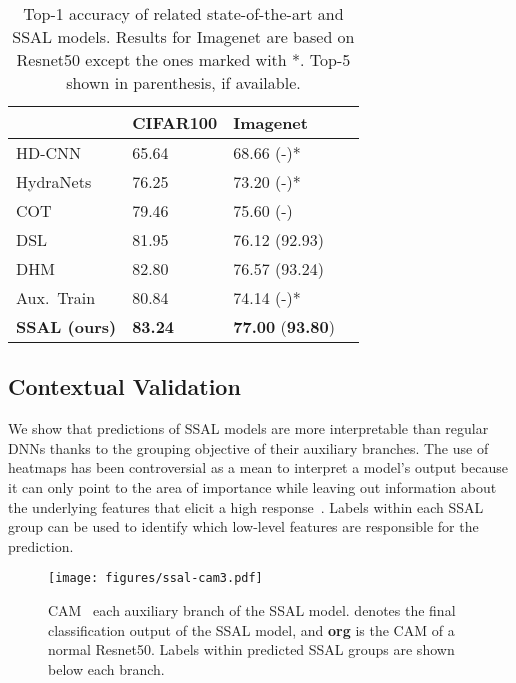 \documentclass[10pt,twocolumn,letterpaper]{article}
\begin{document}
\begin{table}[t]
\centering
\begin{tabulary}{\textwidth}{@{}p{85pt}p{55pt}p{55pt}p{55pt}@{}}
\toprule
                                        & CIFAR100        & Imagenet                                   \\
\midrule
HD-CNN~\cite{yan2015hd}                 & 65.64           & 68.66 (-)*                                 \\
HydraNets~\cite{mullapudi2018hydranets} & 76.25           & 73.20 (-)*                                 \\
COT~\cite{chen2018complement}           & 79.46           & 75.60 (-)                                  \\
DSL~\cite{lee2015deeply,li2020dynamic}  & 81.95           & 76.12 (92.93)                              \\
DHM~\cite{li2020dynamic}                & 82.80           & 76.57 (93.24)                              \\
Aux.~Train~\cite{zhang2020auxiliary}    & 80.84           & 74.14 (-)*                                 \\
\textbf{SSAL (ours)}                    & \textbf{83.24}  & \textbf{77.00}  (\textbf{93.80})   \\
\bottomrule
\end{tabulary}
\caption{Top-1 accuracy of related state-of-the-art and SSAL models. Results for Imagenet are based on Resnet50 except the ones marked with *. Top-5 shown in parenthesis, if available.}
\label{tab:sota}
\end{table}


\subsection{Contextual Validation}
We show that predictions of SSAL models are more interpretable than regular DNNs thanks to the grouping objective of their auxiliary branches.
The use of heatmaps has been controversial as a mean to interpret a model's output because it can only point to the area of importance while leaving out information about the underlying features that elicit a high response~\cite{rudin2019stop}.
Labels within each SSAL group can be used to identify which low-level features are responsible for the prediction.


\begin{figure}[t]
\centering
    \texttt{[image: figures/ssal-cam3.pdf]}
	\caption{CAM \wrt~each auxiliary branch  of the SSAL model.  denotes the final classification output of the SSAL model, and \textbf{org} is the CAM of a normal Resnet50. Labels within predicted SSAL groups are shown below each branch.}
	\label{fig:ssal-cam}
\end{figure}
\end{document}
